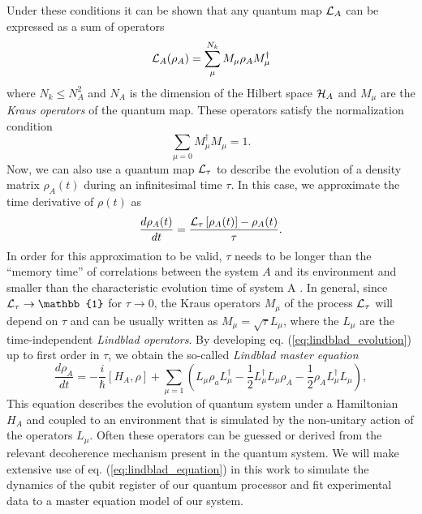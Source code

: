 Under these conditions it can be shown that any quantum map $\LA{A}$ can be expressed as a sum of operators \citep{kraus_states_1983}
%
\begin{equation}
\LA{A}(\rho_A) = \sum\limits_\mu^{N_k} M_\mu \rho_A M_\mu^\dagger \label{eq:kraus_representation}
\end{equation}
%
where $N_k \le N_A^2$ and $N_A$ is the dimension of the Hilbert space $\begin{mathcal}H\end{mathcal}_A$ and $M_\mu$ are the {\it Kraus operators} of the quantum map. These operators satisfy the normalization condition
%
\begin{equation}
\sum\limits_{\mu=0} M_\mu^\dagger M_\mu = \mathrm{1}.
\end{equation}
%
Now, we can also use a quantum map $\LA{\tau}$ to describe the evolution of a density matrix $\rho_A(t)$ during an infinitesimal time $\tau$. In this case, we approximate the time derivative of $\rho(t)$ as
%
\begin{equation}
\frac{d\rho_A(t)}{dt}=\frac{\LA{\tau}\left[\rho_A(t)\right]-\rho_A(t)}{\tau}. \label{eq:lindblad_evolution}
\end{equation}
%
In order for this approximation to be valid, $\tau$ needs to be longer than the ``memory time'' of correlations between the system $A$ and its environment and smaller than the characteristic evolution time of system A \citep{haroche_exploring_2006}. In general, since $\LA{\tau}\to \mathbb{1}$ for $\tau\to 0$, the Kraus operators $M_\mu$ of the process $\LA{\tau}$ will depend on $\tau$ and can be usually written as $M_\mu = \sqrt{\tau} L_\mu$, where the $L_\mu$ are the time-independent {\it Lindblad operators}. By developing eq. (\ref{eq:lindblad_evolution}) up to first order in $\tau$, we obtain the so-called {\it Lindblad master equation}
%
\begin{equation}
\frac{d\rho_A}{dt} = -\frac{i}{\hbar}[H_A,\rho]+\sum\limits_{\mu = 1}\left(L_\mu\rho_aL_\mu^\dagger-\frac{1}{2}L_\mu^\dagger L_\mu\rho_A-\frac{1}{2}\rho_A L_\mu^\dagger L_\mu\right), \label{eq:lindblad_equation}
\end{equation}
%
This equation describes the evolution of quantum system under a Hamiltonian $H_A$ and coupled to an environment that is simulated by the non-unitary action of the operators $L_\mu$. Often these operators can be guessed or derived from the relevant decoherence mechanism present in the quantum system. We will make extensive use of eq. (\ref{eq:lindblad_equation}) in this work to simulate the dynamics of the qubit register of our quantum processor and fit experimental data to a master equation model of our system.



